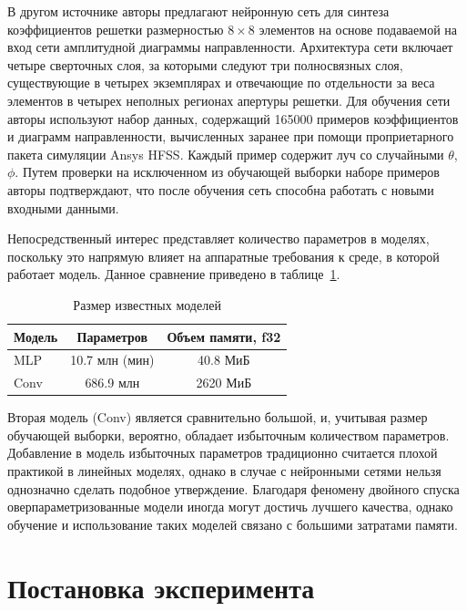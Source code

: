 \documentclass[nonacm, sigconf]{acmart}
\begin{document}
В другом источнике \cite{conv} авторы предлагают нейронную сеть для синтеза коэффициентов решетки размерностью $8 \times 8$ элементов на основе подаваемой на вход сети амплитудной диаграммы направленности. Архитектура сети включает четыре сверточных слоя, за которыми следуют три полносвязных слоя, существующие в четырех экземплярах и отвечающие по отдельности за веса элементов в четырех неполных регионах апертуры решетки. Для обучения сети авторы используют набор данных, содержащий 165000 примеров коэффициентов и диаграмм направленности, вычисленных заранее при помощи проприетарного пакета симуляции Ansys HFSS. Каждый пример содержит луч со случайными $\theta$, $\phi$. Путем проверки на исключенном из обучающей выборки наборе примеров авторы подтверждают, что после обучения сеть способна работать с новыми входными данными.

Непосредственный интерес представляет количество параметров в моделях, поскольку это напрямую влияет на аппаратные требования к среде, в которой работает модель. Данное сравнение приведено в таблице~\ref{network_size}.

%

\begin{table}[h]
\centering
\caption{Размер известных моделей}
\begin{tabular}{lcc}
\toprule
Модель & Параметров & Объем памяти, f32  \\
\midrule
MLP \cite{mlp1} & 10.7 млн (мин) & 40.8 МиБ \\
Conv \cite{conv} & 686.9 млн & 2620 МиБ
\end{tabular}
\label{network_size}
\end{table}

Вторая модель (Conv) является сравнительно большой, и, учитывая размер обучающей выборки, вероятно, обладает избыточным количеством параметров. Добавление в модель избыточных параметров традиционно считается плохой практикой в линейных моделях, однако в случае с нейронными сетями нельзя однозначно сделать подобное утверждение. Благодаря феномену двойного спуска оверпараметризованные модели иногда могут достичь лучшего качества, однако обучение и использование таких моделей связано с большими затратами памяти.

\section{Постановка эксперимента}
\end{document}
